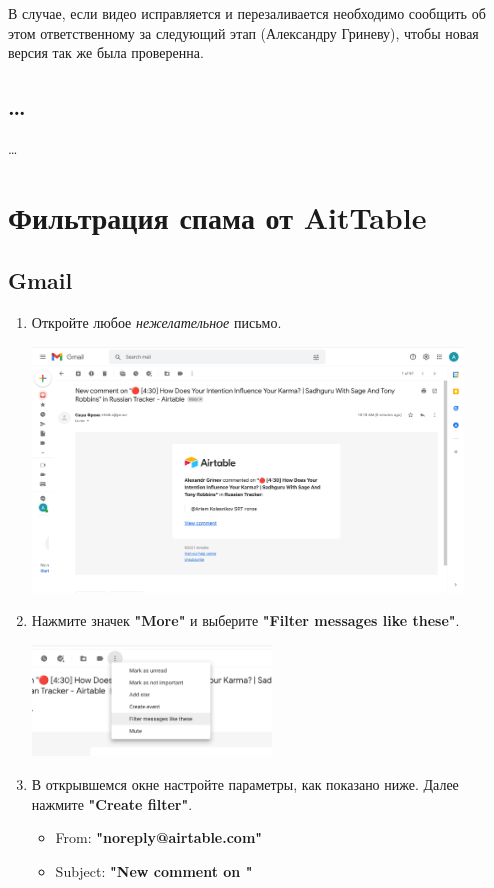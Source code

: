 \documentclass[
a4paper, %
12pt, %
article,
onecolumn, %
openany, %
]{memoir}
\begin{document}
В случае, если видео исправляется и перезаливается необходимо сообщить об этом ответственному за следующий этап (Александру Гриневу), чтобы новая версия так же была проверенна.

\subsection{\ldots}
\ldots


\newpage
\section{Фильтрация спама от AitTable}
\subsection{Gmail}
\begin{enumerate}
    \item Откройте любое \emph{нежелательное} письмо.
	    \begin{center} 
	        \includegraphics[width=0.9\textwidth]{AirTableSpam/gmail0} 
	    \end{center}
    \item Нажмите значек \textbf{"More"} и выберите 
                \textbf{"Filter messages like these"}.
	    \begin{center} 
	        \includegraphics[width=0.5\textwidth]{AirTableSpam/gmail1} 
	    \end{center}
    \item В открывшемся окне настройте параметры, как показано ниже. 
        Далее нажмите \textbf{"Create filter"}.
        \begin{itemize}
            \item From: \textbf{"noreply@airtable.com"}
            \item Subject: \textbf{"New comment on "}
        \end{itemize}


\end{enumerate}
\end{document}
